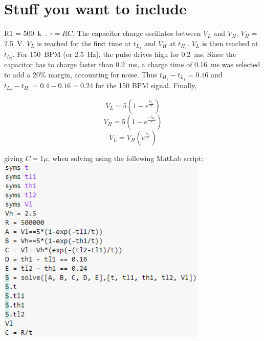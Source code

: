      \chapter{Stuff you want to include}
     \label{app:C}
R1 = \SI{500}{k\Omega}. $\tau = RC$. The capacitor charge oscillates between $V_L$ and $V_H$. $V_H =$ \SI{2.5}{V}. $V_L$ is reached for the first time at $t_{L_1}$ and $V_H$ at $t_{H_1}$. $V_L$ is then reached at  $t_{L_2}$. For \SI{150}{BPM} (or \SI{2.5}{Hz}), the pulse drives high for \SI{0.2}{ms}. Since the capacitor has to charge faster than \SI{0.2}{ms}, a charge time of \SI{0.16}{ms} was selected to add a 20\% margin, accounting for noise. Thus $t_{H_1} - t_{L_1} = 0.16$ and $t_{L_2} - t_{H_1} = 0.4 - 0.16 = 0.24$ for the 150 BPM signal. Finally,

$$V_L = 5\left(1-e^{\frac{t_{L_1}}{\tau}}\right)$$
$$V_H = 5\left(1-e^{\frac{-t_{H_1}}{\tau}}\right)$$
$$V_L = V_H\left(e^{\frac{t_{L_1}}{\tau}}\right)$$

giving $C = 1\mu$, when solving using the following MatLab script:\\

\includegraphics[width = 0.75\textwidth]{./Figures/script}